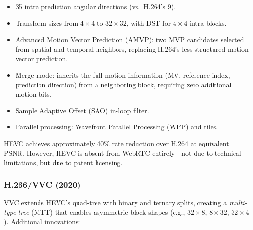 \begin{itemize}
\item 35 intra prediction angular directions (vs.\ H.264's 9).
\item Transform sizes from $4\!\times\!4$ to $32\!\times\!32$, with
  DST for $4\!\times\!4$ intra blocks.
\item Advanced Motion Vector Prediction (AMVP): two MVP candidates selected
  from spatial and temporal neighbors, replacing H.264's less structured
  motion vector prediction.
\item Merge mode: inherits the full motion information (MV, reference
  index, prediction direction) from a neighboring block, requiring zero
  additional motion bits.
\item Sample Adaptive Offset (SAO) in-loop filter.
\item Parallel processing: Wavefront Parallel Processing (WPP) and tiles.
\end{itemize}

HEVC achieves approximately 40\% rate reduction over H.264 at equivalent
PSNR. However, HEVC is absent from WebRTC entirely---not due to technical
limitations, but due to patent licensing.


\subsubsection{H.266/VVC (2020)}
\label{sec:vvc}

VVC extends HEVC's quad-tree with binary and ternary splits, creating a
\emph{multi-type tree} (MTT) that enables asymmetric block shapes (e.g.,
$32\!\times\!8$, $8\!\times\!32$, $32\!\times\!4$). Additional
innovations:

